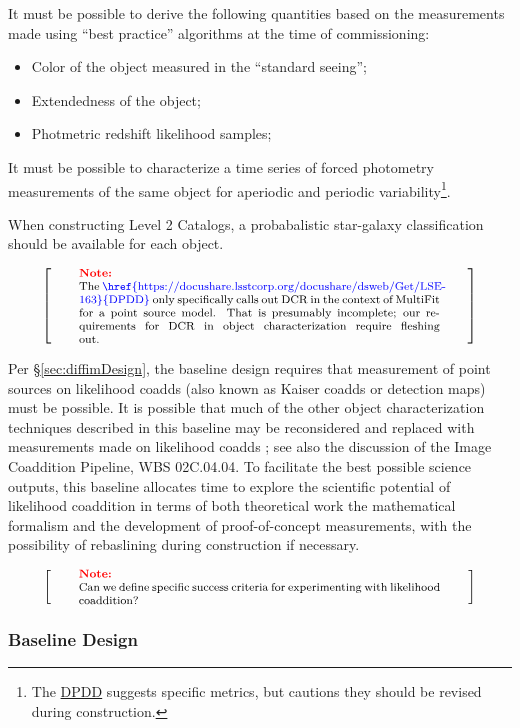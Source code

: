 \documentclass[12pt]{article}
\newcommand{\ds}[2]{{\color{blue} \href{https://docushare.lsstcorp.org/docushare/dsweb/Get/#1}{#2}}\xspace}
\newcommand{\DPDD}{\ds{LSE-163}{DPDD}}
\newcommand{\wbsCoadd}{WBS 02C.04.04}
\newenvironment{note}[1][Note]
{
  \begin{displaymath}
    \left[ \qquad
    \begin{minipage}[h]{.75\linewidth}
      \color{red} \footnotesize
      \textbf{#1:} \newline
      \color{black}
}
{
    \end{minipage}
    \normalsize
    \qquad \right]
  \end{displaymath}
}
\begin{document}
It must be possible to derive the following quantities based on the measurements made using ``best practice'' algorithms at the time of commissioning:
\begin{itemize}
  \item{Color of the object measured in the ``standard seeing'';}
  \item{Extendedness of the object;}
  \item{Photmetric redshift likelihood samples;}
\end{itemize}

It must be possible to characterize a time series of forced photometry measurements of the same object for aperiodic and periodic variability\footnote{The \DPDD{} suggests specific metrics, but cautions they should be revised during construction.}.

When constructing Level 2 Catalogs, a probabalistic star-galaxy classification should be available for each object.

\begin{note}
The \DPDD{} only specifically calls out DCR in the context of MultiFit for a point source model. That is presumably incomplete; our requirements for DCR in object characterization require fleshing out.
\end{note}

Per \S\ref{sec:diffimDesign}, the baseline design requires that measurement of point sources on likelihood coadds (also known as Kaiser coadds or detection maps) must be possible. It is possible that much of the other object characterization techniques described in this baseline may be reconsidered and replaced with measurements made on likelihood coadds \cite[\S8.2.1]{Bosch15}; see also the discussion of the Image Coaddition Pipeline, \wbsCoadd{}. To facilitate the best possible science outputs, this baseline allocates time to explore the scientific potential of likelihood coaddition in terms of both theoretical work the mathematical formalism and the development of proof-of-concept measurements, with the possibility of rebaslining during construction if necessary.

\begin{note}
Can we define specific success criteria for experimenting with likelihood coaddition?
\end{note}

\subsubsection{Baseline Design}
\end{document}
